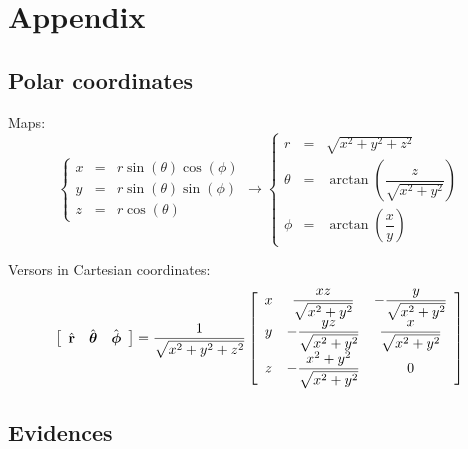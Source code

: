 
\section{Appendix}

\subsection{Polar coordinates}

Maps:
\begin{equation} \left\{ \begin{array}{rcl} x & = & r \sin(\theta) \cos(\phi) \\ y & = & r \sin(\theta) \sin(\phi) \\ z & = & r \cos(\theta) \end{array}\right. \rightarrow \left\{ \begin{array}{rcl} r & = & \sqrt{x^2+y^2+z^2} \\ \theta & = & \arctan\left(\dfrac{z}{\sqrt{x^2+y^2}}\right) \\ \phi & = & \arctan\left( \dfrac{x}{y} \right) \end{array} \right. \end{equation}

Versors in Cartesian coordinates:
\begin{equation} \left[ \begin{array}{ccc} \hat{\mathbf{r}} & \hat{\boldsymbol{\theta}} & \hat{\boldsymbol{\phi}} \end{array}\right] = \dfrac{1}{\sqrt{x^2+y^2+z^2}} \left[ \begin{array}{ccc} x & \dfrac{xz}{\sqrt{x^2+y^2}} & -\dfrac{y}{\sqrt{x^2+y^2}} \\ y & -\dfrac{yz}{\sqrt{x^2+y^2}} & \dfrac{x}{\sqrt{x^2+y^2}} \\ z & -\dfrac{x^2+y^2}{\sqrt{x^2+y^2}} & 0 \end{array} \right] \end{equation}

\subsection{Evidences}

